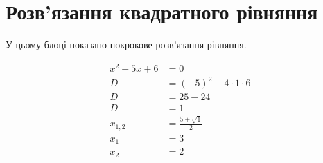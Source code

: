 \documentclass[12pt]{article}
\begin{document}
\section*{Розв'язання квадратного рівняння}


У цьому блоці показано покрокове розв’язання рівняння.

\begin{align*}
x^2-5x+6 &= 0\\
D &= (-5)^2-4\cdot1\cdot6\\
D &= 25-24\\
D &= 1\\
x_{1,2} &= \frac{5\pm\sqrt{1}}{2}\\
x_1 &= 3\\
x_2 &= 2
\end{align*}
\end{document}
